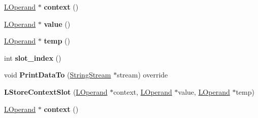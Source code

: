 \begin{DoxyCompactItemize}
\item 
\hyperlink{classv8_1_1internal_1_1_l_operand}{L\+Operand} $\ast$ {\bfseries context} ()\hypertarget{classv8_1_1internal_1_1_l_store_context_slot_a6b072f758dab90336746518191c017e6}{}\label{classv8_1_1internal_1_1_l_store_context_slot_a6b072f758dab90336746518191c017e6}

\item 
\hyperlink{classv8_1_1internal_1_1_l_operand}{L\+Operand} $\ast$ {\bfseries value} ()\hypertarget{classv8_1_1internal_1_1_l_store_context_slot_a0c28014969c34254ff6c3adcac58abbb}{}\label{classv8_1_1internal_1_1_l_store_context_slot_a0c28014969c34254ff6c3adcac58abbb}

\item 
\hyperlink{classv8_1_1internal_1_1_l_operand}{L\+Operand} $\ast$ {\bfseries temp} ()\hypertarget{classv8_1_1internal_1_1_l_store_context_slot_a21856d771e86c39c98d6c66fa824c523}{}\label{classv8_1_1internal_1_1_l_store_context_slot_a21856d771e86c39c98d6c66fa824c523}

\item 
int {\bfseries slot\+\_\+index} ()\hypertarget{classv8_1_1internal_1_1_l_store_context_slot_ae3af6274dd8f0678313b444f513b440d}{}\label{classv8_1_1internal_1_1_l_store_context_slot_ae3af6274dd8f0678313b444f513b440d}

\item 
void {\bfseries Print\+Data\+To} (\hyperlink{classv8_1_1internal_1_1_string_stream}{String\+Stream} $\ast$stream) override\hypertarget{classv8_1_1internal_1_1_l_store_context_slot_a559e1a9bb270f10754b7abd4f54768dc}{}\label{classv8_1_1internal_1_1_l_store_context_slot_a559e1a9bb270f10754b7abd4f54768dc}

\item 
{\bfseries L\+Store\+Context\+Slot} (\hyperlink{classv8_1_1internal_1_1_l_operand}{L\+Operand} $\ast$context, \hyperlink{classv8_1_1internal_1_1_l_operand}{L\+Operand} $\ast$value, \hyperlink{classv8_1_1internal_1_1_l_operand}{L\+Operand} $\ast$temp)\hypertarget{classv8_1_1internal_1_1_l_store_context_slot_ac22c1f367afeeac8612b5c3fce152218}{}\label{classv8_1_1internal_1_1_l_store_context_slot_ac22c1f367afeeac8612b5c3fce152218}

\item 
\hyperlink{classv8_1_1internal_1_1_l_operand}{L\+Operand} $\ast$ {\bfseries context} ()\hypertarget{classv8_1_1internal_1_1_l_store_context_slot_a6b072f758dab90336746518191c017e6}{}\label{classv8_1_1internal_1_1_l_store_context_slot_a6b072f758dab90336746518191c017e6}


\end{DoxyCompactItemize}
